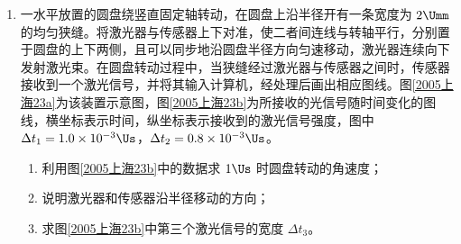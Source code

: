 \documentclass[\gkver]{gaokaozhenti}
\begin{document}
\begin{enumerate}
{此时金属棒克服安培力做功的功率等于电路中电阻 $R$ 消耗的电功率

$Fv=P$ ④

由③、④两式解得 $v=\frac{P}{F}=\frac{8}{0.2\times10\times(0.6-0.25\times0.8)}\Ums=10\Ums$ ⑤

（3）设电路中电流为 $I$，两导轨间金属棒的长为 $l$，磁场的磁感应强度为 $B$

$I=\frac{Blv}{R}$ ⑥

$P=I^{2}R$ ⑦

由⑥、⑦两式解得 $B=\frac{\sqrt{PR}}{vl}=\frac{\sqrt{8\times2}}{10\times1}\UT=0.4\UT$ ⑧

磁场方向垂直导轨平面向上。
}

\item
一水平放置的圆盘绕竖直固定轴转动，在圆盘上沿半径开有一条宽度为 $2\Umm$ 的均匀狭缝。将激光器与传感器上下对准，使二者间连线与转轴平行，分别置于圆盘的上下两侧，且可以同步地沿圆盘半径方向匀速移动，激光器连续向下发射激光束。在圆盘转动过程中，当狭缝经过激光器与传感器之间时，传感器接收到一个激光信号，并将其输入计算机，经处理后画出相应图线。图\ref{2005上海23a}为该装置示意图，图\ref{2005上海23b}为所接收的光信号随时间变化的图线，横坐标表示时间，纵坐标表示接收到的激光信号强度，图中 $\Delta t_{1}=1.0\times10^{-3}\Us$，$\Delta t_{2}=0.8\times10^{-3}\Us$。


\begin{enumerate}
	\item
	利用图\ref{2005上海23b}中的数据求 $1\Us$ 时圆盘转动的角速度；
	\item
	说明激光器和传感器沿半径移动的方向；
	\item
	求图\ref{2005上海23b}中第三个激光信号的宽度 $\Delta t_{3}$。
\end{enumerate}

\end{enumerate}
\end{document}
